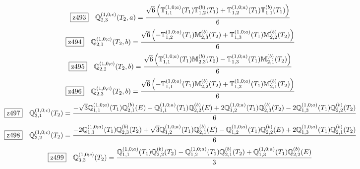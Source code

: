 \documentclass[fleqn,10pt,landscape]{jsarticle}
\begin{document}
\begin{dmath*}
\hspace*{3mm}\fbox{z493}\quad \mathbb{Q}_{2,3}^{(1,0;c)}(T_{2},a)=\frac{\sqrt{6} \left(\mathbb{T}_{1,1}^{(1,0;a)}(T_{1}) \mathbb{T}_{1,2}^{(b)}(T_{1}) + \mathbb{T}_{1,2}^{(1,0;a)}(T_{1}) \mathbb{T}_{1,1}^{(b)}(T_{1})\right)}{6}
\end{dmath*}
\begin{dmath*}
\hspace*{3mm}\fbox{z494}\quad \mathbb{Q}_{2,1}^{(1,0;c)}(T_{2},b)=\frac{\sqrt{6} \left(- \mathbb{T}_{1,2}^{(1,0;a)}(T_{1}) \mathbb{M}_{2,3}^{(b)}(T_{2}) + \mathbb{T}_{1,3}^{(1,0;a)}(T_{1}) \mathbb{M}_{2,2}^{(b)}(T_{2})\right)}{6}
\end{dmath*}
\begin{dmath*}
\hspace*{3mm}\fbox{z495}\quad \mathbb{Q}_{2,2}^{(1,0;c)}(T_{2},b)=\frac{\sqrt{6} \left(\mathbb{T}_{1,1}^{(1,0;a)}(T_{1}) \mathbb{M}_{2,3}^{(b)}(T_{2}) - \mathbb{T}_{1,3}^{(1,0;a)}(T_{1}) \mathbb{M}_{2,1}^{(b)}(T_{2})\right)}{6}
\end{dmath*}
\begin{dmath*}
\hspace*{3mm}\fbox{z496}\quad \mathbb{Q}_{2,3}^{(1,0;c)}(T_{2},b)=\frac{\sqrt{6} \left(- \mathbb{T}_{1,1}^{(1,0;a)}(T_{1}) \mathbb{M}_{2,2}^{(b)}(T_{2}) + \mathbb{T}_{1,2}^{(1,0;a)}(T_{1}) \mathbb{M}_{2,1}^{(b)}(T_{2})\right)}{6}
\end{dmath*}
\begin{dmath*}
\hspace*{3mm}\fbox{z497}\quad \mathbb{Q}_{3,1}^{(1,0;c)}(T_{2})=\frac{- \sqrt{3} \mathbb{Q}_{1,1}^{(1,0;a)}(T_{1}) \mathbb{Q}_{2,1}^{(b)}(E) - \mathbb{Q}_{1,1}^{(1,0;a)}(T_{1}) \mathbb{Q}_{2,2}^{(b)}(E) + 2 \mathbb{Q}_{1,2}^{(1,0;a)}(T_{1}) \mathbb{Q}_{2,3}^{(b)}(T_{2}) - 2 \mathbb{Q}_{1,3}^{(1,0;a)}(T_{1}) \mathbb{Q}_{2,2}^{(b)}(T_{2})}{6}
\end{dmath*}
\begin{dmath*}
\hspace*{3mm}\fbox{z498}\quad \mathbb{Q}_{3,2}^{(1,0;c)}(T_{2})=\frac{- 2 \mathbb{Q}_{1,1}^{(1,0;a)}(T_{1}) \mathbb{Q}_{2,3}^{(b)}(T_{2}) + \sqrt{3} \mathbb{Q}_{1,2}^{(1,0;a)}(T_{1}) \mathbb{Q}_{2,1}^{(b)}(E) - \mathbb{Q}_{1,2}^{(1,0;a)}(T_{1}) \mathbb{Q}_{2,2}^{(b)}(E) + 2 \mathbb{Q}_{1,3}^{(1,0;a)}(T_{1}) \mathbb{Q}_{2,1}^{(b)}(T_{2})}{6}
\end{dmath*}
\begin{dmath*}
\hspace*{3mm}\fbox{z499}\quad \mathbb{Q}_{3,3}^{(1,0;c)}(T_{2})=\frac{\mathbb{Q}_{1,1}^{(1,0;a)}(T_{1}) \mathbb{Q}_{2,2}^{(b)}(T_{2}) - \mathbb{Q}_{1,2}^{(1,0;a)}(T_{1}) \mathbb{Q}_{2,1}^{(b)}(T_{2}) + \mathbb{Q}_{1,3}^{(1,0;a)}(T_{1}) \mathbb{Q}_{2,2}^{(b)}(E)}{3}
\end{dmath*}
\end{document}
